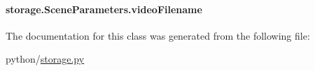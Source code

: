 \hypertarget{classstorage_1_1SceneParameters_a28f22a4beff21db7eba016a3295c0eb2}{
\paragraph[{video\-Filename}]{\setlength{\rightskip}{0pt plus 5cm}storage.\-Scene\-Parameters.\-video\-Filename}}\label{classstorage_1_1SceneParameters_a28f22a4beff21db7eba016a3295c0eb2}


The documentation for this class was generated from the following file\-:\begin{DoxyCompactItemize}
\item 
python/\hyperlink{storage_8py}{storage.\-py}\end{DoxyCompactItemize}
